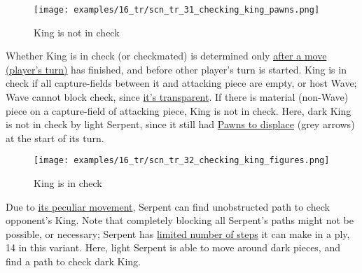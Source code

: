 \vspace*{-0.7\baselineskip}
\noindent
\begin{wrapfigure}[15]{l}{0.4\textwidth}
\centering
\texttt{[image: examples/16\_tr/scn\_tr\_31\_checking\_king\_pawns.png]}
\vspace*{-0.7\baselineskip}
\caption{King is not in check}
\label{fig:scn_tr_31_checking_king_pawns}
\end{wrapfigure}
Whether King is in check (or checkmated) is determined only
\hyperref[fig:scn_mv_051_cascaded_piece_check_init]{after a move (player's turn)}
has finished, and before other player's turn is started.\newline
\indent
King is in check if all capture-fields between it and attacking piece are empty,
or host Wave; Wave cannot block check, since
\hyperref[fig:scn_mv_007_wave_is_transparent]{it's transparent}. If there is material
(non-Wave) piece on a capture-field of attacking piece, King is not in check.\newline
\indent
Here, dark King is not in check by light Serpent, since it still had
\hyperref[fig:scn_tr_19_displacement_init]{Pawns to displace} (grey arrows) at
the start of its turn.

\noindent
\begin{wrapfigure}[16]{l}{0.4\textwidth}
\centering
\texttt{[image: examples/16\_tr/scn\_tr\_32\_checking\_king\_figures.png]}
\vspace*{-0.7\baselineskip}
\caption{King is in check}
\label{fig:scn_tr_32_checking_king_figures}
\end{wrapfigure}
Due to \hyperref[fig:scn_tr_01_serpent_diagonals]{its peculiar movement},
Serpent can find unobstructed path to check opponent's King.\newline
\indent
Note that completely blocking all Serpent's paths might not be possible, or
necessary; Serpent has \hyperref[fig:scn_tr_05_serpent_end]{limited number of steps}
it can make in a ply, 14 in this variant.\newline
\indent
Here, light Serpent is able to move around dark pieces, and find a path to check
dark King.

\clearpage %

